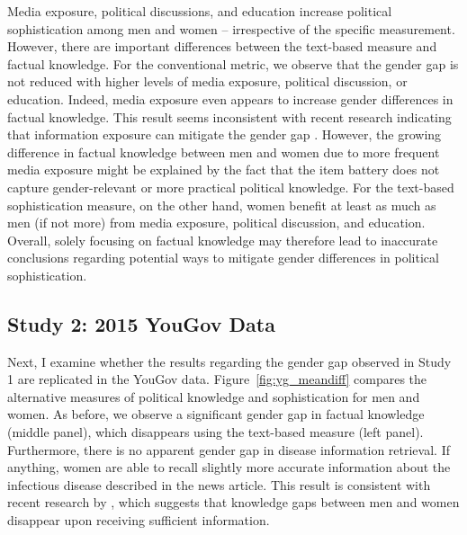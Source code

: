 \documentclass[12pt]{article}
\begin{document}
Media exposure, political discussions, and education increase political sophistication among men and women -- irrespective of the specific measurement. However, there are important differences between the text-based measure and factual knowledge. For the conventional metric, we observe that the gender gap is not reduced with higher levels of media exposure, political discussion, or education. Indeed, media exposure even appears to increase gender differences in factual knowledge. This result seems inconsistent with recent research indicating that information exposure can mitigate the gender gap \citep[e.g.,][]{jerit2017revisiting}. However, the growing difference in factual knowledge between men and women due to more frequent media exposure might be explained by the fact that the item battery does not capture gender-relevant \citep{dolan2011women} or more practical \citep{stolle2010women} political knowledge. For the text-based sophistication measure, on the other hand, women benefit at least as much as men (if not more) from media exposure, political discussion, and education. Overall, solely focusing on factual knowledge may therefore lead to inaccurate conclusions regarding potential ways to mitigate gender differences in political sophistication.


\subsection*{Study 2: 2015 YouGov Data}

Next, I examine whether the results regarding the gender gap observed in Study 1 are replicated in the YouGov data. Figure~\ref{fig:yg_meandiff} compares the alternative measures of political knowledge and sophistication for men and women. As before, we observe a significant gender gap in factual knowledge (middle panel), which disappears using the text-based measure (left panel). Furthermore, there is no apparent gender gap in disease information retrieval. If anything, women are able to recall slightly more accurate information about the infectious disease described in the news article. This result is consistent with recent research by \citet{jerit2017revisiting}, which suggests that knowledge gaps between men and women disappear upon receiving sufficient information.
\end{document}
